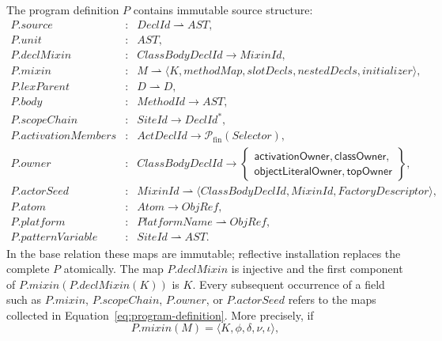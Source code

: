 \documentclass[11pt]{article}
\numberwithin{equation}{section}
\newcommand{\kw}[1]{\ensuremath{\mathsf{#1}}}
\begin{document}
The program definition $P$ contains immutable source structure:
\begin{equation}\label{eq:program-definition}
\begin{array}{rcl}
 P.\mathit{source} &: & \mathit{DeclId}\rightharpoonup\mathit{AST},\\
 P.\mathit{unit} &: & \mathit{AST},\\
 P.\mathit{declMixin} &: & \mathit{ClassBodyDeclId}\to\mathit{MixinId},\\
 P.\mathit{mixin} &: & M \rightharpoonup
   \langle K,\mathit{methodMap},\mathit{slotDecls},
                 \mathit{nestedDecls},\mathit{initializer}\rangle,\\
 P.\mathit{lexParent} &: & D \rightharpoonup D,\\
P.\mathit{body} &: & \mathit{MethodId}\to\mathit{AST},\\
P.\mathit{scopeChain} &: & \mathit{SiteId}\to\mathit{DeclId}^{*},\\
P.\mathit{activationMembers} &: & \mathit{ActDeclId}\to
  \mathcal P_{\mathrm{fin}}(\mathit{Selector}),\\
P.\mathit{owner} &: & \mathit{ClassBodyDeclId}\to
 \left\{\begin{gathered}\kw{activationOwner},\kw{classOwner},\\[-1mm]
   \kw{objectLiteralOwner},\kw{topOwner}\end{gathered}\right\},\\
P.\mathit{actorSeed} &: & \mathit{MixinId}\rightharpoonup
 \langle\mathit{ClassBodyDeclId},\mathit{MixinId},
        \mathit{FactoryDescriptor}\rangle,\\
P.\mathit{atom} &: & \mathit{Atom}\to\mathit{ObjRef},\\
P.\mathit{platform} &: & \mathit{PlatformName}\rightharpoonup\mathit{ObjRef},\\
P.\mathit{patternVariable} &: & \mathit{SiteId}\rightharpoonup\mathit{AST}.
\end{array}
\end{equation}
In the base relation these maps are immutable; reflective installation replaces
the complete $P$ atomically.  The map $P.\mathit{declMixin}$ is injective and
the first component of $P.\mathit{mixin}(P.\mathit{declMixin}(K))$ is $K$.
Every subsequent occurrence of a field such as $P.\mathit{mixin}$,
$P.\mathit{scopeChain}$, $P.\mathit{owner}$, or $P.\mathit{actorSeed}$ refers to
the maps collected in
Equation~\eqref{eq:program-definition}.
More precisely, if
\begin{equation}\label{eq:mixin-record}
  P.\mathit{mixin}(M)
    =\langle K,\phi,\delta,\nu,\iota\rangle,
\end{equation}
\end{document}
